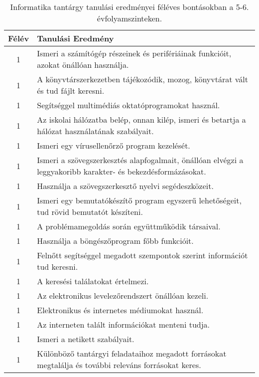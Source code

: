        
           \begin{longtable}{c | p{12cm} }
            \caption[Informatika 5-6.]{Informatika tantárgy tanulási eredményei féléves bontásokban a 5-6. évfolyamszinteken. }  \\

            \textbf{Félév} & \textbf{Tanulási Eredmény} \\
            \hline
            \endhead
                                
                                          1 &  Ismeri a számítógép részeinek és perifériáinak funkcióit, azokat önállóan használja. \\ \hline
                                          1 &  A könyvtárszerkezetben tájékozódik, mozog, könyvtárat vált és tud fájlt keresni. \\ \hline
                                          1 &  Segítséggel multimédiás oktatóprogramokat használ. \\ \hline
                                          1 &  Az iskolai hálózatba belép, onnan kilép, ismeri és betartja a hálózat használatának szabályait. \\ \hline
                                          1 &  Ismeri egy vírusellenőrző program kezelését. \\ \hline
                                          1 &  Ismeri a szövegszerkesztés alapfogalmait, önállóan elvégzi a leggyakoribb karakter- és bekezdésformázásokat. \\ \hline
                                          1 &  Használja a szövegszerkesztő nyelvi segédeszközeit. \\ \hline
                                          1 &  Ismeri egy bemutatókészítő program egyszerű lehetőségeit, tud rövid bemutatót készíteni. \\ \hline
                                          1 &  A problémamegoldás során együttműködik társaival. \\ \hline
                                          1 &  Használja a böngészőprogram főbb funkcióit. \\ \hline
                                          1 &  Felnőtt segítséggel megadott szempontok szerint információt tud keresni. \\ \hline
                                          1 &  A keresési találatokat értelmezi. \\ \hline
                                          1 &  Az elektronikus levelezőrendszert önállóan kezeli. \\ \hline
                                          1 &  Elektronikus és internetes médiumokat használ. \\ \hline
                                          1 &  Az interneten talált információkat menteni tudja. \\ \hline
                                          1 &  Ismeri a netikett szabályait. \\ \hline
                                          1 &  Különböző tantárgyi feladataihoz megadott forrásokat megtalálja és további releváns forrásokat keres. \\ \hline
                                      

\end{longtable}
